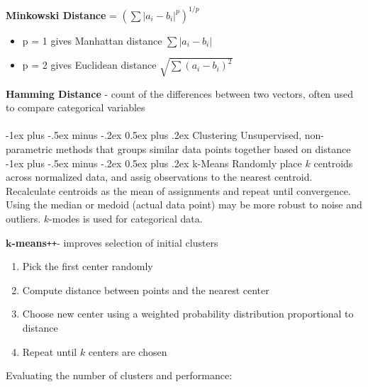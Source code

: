 \documentclass[10pt,landscape]{article}
\makeatletter
\renewcommand{\section}{\@startsection{section}{1}{0mm}%
                                {-1ex plus -.5ex minus -.2ex}%
                                {0.5ex plus .2ex}%
                                {\normalfont\large\bfseries}}
\renewcommand{\subsection}{\@startsection{subsection}{2}{0mm}%
                                {-1ex plus -.5ex minus -.2ex}%
                                {0.5ex plus .2ex}%
                                {\normalfont\normalsize\bfseries}}
\makeatother
\begin{document}
\begin{multicols}{3}
    \textbf{Minkowski Distance} = $(\sum|a_i - b_i|^p)^{1/p}$
    \begin{itemize}[label={--},leftmargin=4mm]
        \itemsep -.4mm
        \item p = 1 gives Manhattan distance ${\sum|a_i - b_i|}$
        \item p = 2 gives Euclidean distance $\sqrt{\sum(a_i - b_i)^2}$
    \end{itemize}

    \textbf{Hamming Distance} - count of the differences between two vectors, often used to compare categorical variables \\

    \textcolor{white}{.}\vspace{-5mm}\\ %
    \section{Clustering}
    Unsupervised, non-parametric methods that groups similar data points together based on distance
    \subsection{k-Means}
    Randomly place $k$ centroids across normalized data, and assig observations to the nearest centroid. Recalculate centroids as the mean of assignments and repeat until convergence. Using the median or medoid (actual data point) may be more robust to noise and outliers. $k$-modes is used for categorical data.

    \def\Plus{\texttt{+}}
    $\boldsymbol{k}$\textbf{-means}\Plus\Plus\hspace{1mm}- improves selection of initial clusters
    \begin{enumerate}[leftmargin=5mm]
        \itemsep -.4mm
        \item Pick the first center randomly
        \item Compute distance between points and the nearest center
        \item Choose new center using a weighted probability distribution proportional to distance
        \item Repeat until $k$ centers are chosen
    \end{enumerate}

    Evaluating the number of clusters and performance:


\end{multicols}
\end{document}
